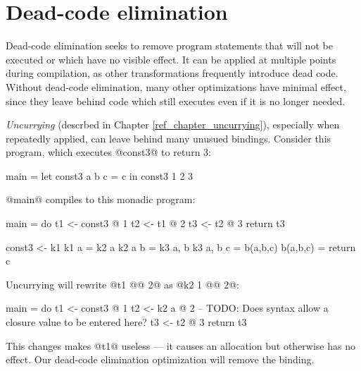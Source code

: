 \documentclass[12pt]{report}
\begin{document}


\chapter{Dead-code elimination}

Dead-code elimination seeks to remove program statements that will not
be executed or which have no visible effect. It can be applied at multiple
points during compilation, as other transformations frequently introduce 
dead code. Without dead-code elimination, many other optimizations have
minimal effect, since they leave behind code which still executes even if
it is no longer needed.

\emph{Uncurrying} (descrbed in Chapter \ref{ref_chapter_uncurrying}), especially
when repeatedly applied, can leave behind many unusued bindings. Consider
this program, which executes @const3@ to return 3:

\begin{code}
main = 
  let const3 a b c = c 
  in const3 1 2 3
\end{code}

@main@ compiles to this monadic program:

\begin{code}
main = do
 t1 <- const3 @ 1
 t2 <- t1 @ 2
 t3 <- t2 @ 3
 return t3

const3 <- k1 {}
k1 {} a = k2 {a} 
k2 {a} b = k3 {a, b}
k3 {a, b} c = b(a,b,c)
b(a,b,c) = return c
\end{code}

Uncurrying will rewrite @t1 @@ 2@ as @k2 {1} @@ 2@:

\begin{code}
main = do
 t1 <- const3 @ 1
 t2 <- k2 {a} @ 2 -- TODO: Does syntax allow a closure value to be entered here?
 t3 <- t2 @ 3
 return t3
\end{code}

This changes makes @t1@ useless --- it causes an allocation but otherwise 
has no effect. Our dead-code elimination optimization will remove the binding.

\end{document}
